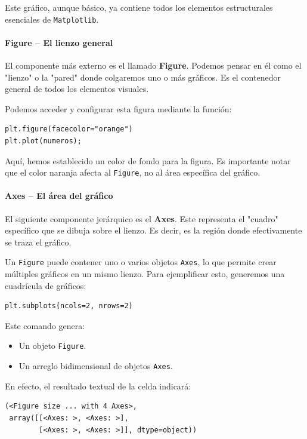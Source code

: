 \documentclass{article}
\theoremstyle{nonumberplain}
\begin{document}
Este gráfico, aunque básico, ya contiene todos los elementos estructurales esenciales de \texttt{Matplotlib}.

\paragraph{Figure – El lienzo general}

El componente más externo es el llamado \textbf{Figure}. Podemos pensar en él como el "lienzo" o la "pared" donde colgaremos uno o más gráficos. Es el contenedor general de todos los elementos visuales.

Podemos acceder y configurar esta figura mediante la función:

\begin{verbatim}
plt.figure(facecolor="orange")
plt.plot(numeros);
\end{verbatim}

Aquí, hemos establecido un color de fondo para la figura. Es importante notar que el color naranja afecta al \texttt{Figure}, no al área específica del gráfico.

\paragraph{Axes – El área del gráfico}

El siguiente componente jerárquico es el \textbf{Axes}. Este representa el "cuadro" específico que se dibuja sobre el lienzo. Es decir, es la región donde efectivamente se traza el gráfico.

Un \texttt{Figure} puede contener uno o varios objetos \texttt{Axes}, lo que permite crear múltiples gráficos en un mismo lienzo. Para ejemplificar esto, generemos una cuadrícula de gráficos:

\begin{verbatim}
plt.subplots(ncols=2, nrows=2)
\end{verbatim}

Este comando genera:

\begin{itemize}
  \item Un objeto \texttt{Figure}.
  \item Un arreglo bidimensional de objetos \texttt{Axes}.
\end{itemize}

En efecto, el resultado textual de la celda indicará:

\begin{verbatim}
(<Figure size ... with 4 Axes>,
 array([[<Axes: >, <Axes: >],
        [<Axes: >, <Axes: >]], dtype=object))
\end{verbatim}
\end{document}
